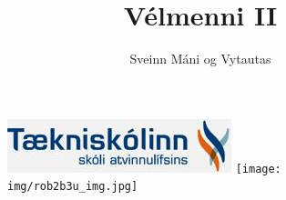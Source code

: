 \documentclass{article}
\begin{document}
\title{Vélmenni II}
\author{Sveinn Máni og Vytautas}
\maketitle
\begin{figure}[h]
\centering
\includegraphics[scale=.65]{img/tskoli.jpg}
\texttt{[image: img/rob2b3u\_img.jpg]}
\end{figure}
\newpage
\tableofcontents
\newpage



\newpage



\newpage



\newpage

\end{document}
